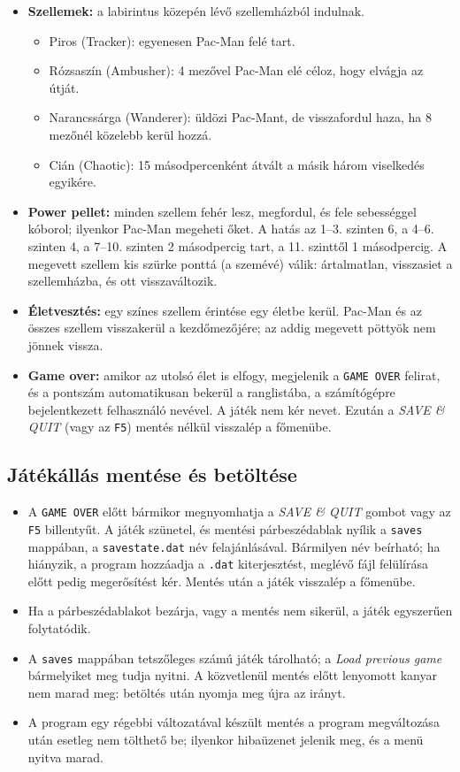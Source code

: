 \documentclass[11pt, a4paper]{article}
\begin{document}
\begin{itemize}
    \item \textbf{Szellemek:} a labirintus közepén lévő szellemházból indulnak.
    \begin{itemize}
        \item Piros (Tracker): egyenesen Pac-Man felé tart.
        \item Rózsaszín (Ambusher): 4 mezővel Pac-Man elé céloz, hogy elvágja az útját.
        \item Narancssárga (Wanderer): üldözi Pac-Mant, de visszafordul haza, ha 8 mezőnél közelebb kerül hozzá.
        \item Cián (Chaotic): 15 másodpercenként átvált a másik három viselkedés egyikére.
    \end{itemize}
    \item \textbf{Power pellet:} minden szellem fehér lesz, megfordul, és fele sebességgel kóborol; ilyenkor Pac-Man megeheti őket. A hatás az 1--3. szinten 6, a 4--6. szinten 4, a 7--10. szinten 2 másodpercig tart, a 11. szinttől 1 másodpercig. A megevett szellem kis szürke ponttá (a szemévé) válik: ártalmatlan, visszasiet a szellemházba, és ott visszaváltozik.
    \item \textbf{Életvesztés:} egy színes szellem érintése egy életbe kerül. Pac-Man és az összes szellem visszakerül a kezdőmezőjére; az addig megevett pöttyök nem jönnek vissza.
    \item \textbf{Game over:} amikor az utolsó élet is elfogy, megjelenik a \texttt{GAME OVER} felirat, és a pontszám automatikusan bekerül a ranglistába, a számítógépre bejelentkezett felhasználó nevével. A játék nem kér nevet. Ezután a \textit{SAVE \& QUIT} (vagy az \texttt{F5}) mentés nélkül visszalép a főmenübe.
\end{itemize}

\subsection*{Játékállás mentése és betöltése}
\begin{itemize}
    \item A \texttt{GAME OVER} előtt bármikor megnyomhatja a \textit{SAVE \& QUIT} gombot vagy az \texttt{F5} billentyűt. A játék szünetel, és mentési párbeszédablak nyílik a \texttt{saves} mappában, a \texttt{savestate.dat} név felajánlásával. Bármilyen név beírható; ha hiányzik, a program hozzáadja a \texttt{.dat} kiterjesztést, meglévő fájl felülírása előtt pedig megerősítést kér. Mentés után a játék visszalép a főmenübe.
    \item Ha a párbeszédablakot bezárja, vagy a mentés nem sikerül, a játék egyszerűen folytatódik.
    \item A \texttt{saves} mappában tetszőleges számú játék tárolható; a \textit{Load previous game} bármelyiket meg tudja nyitni. A közvetlenül mentés előtt lenyomott kanyar nem marad meg: betöltés után nyomja meg újra az irányt.
    \item A program egy régebbi változatával készült mentés a program megváltozása után esetleg nem tölthető be; ilyenkor hibaüzenet jelenik meg, és a menü nyitva marad.
\end{itemize}
\end{document}
